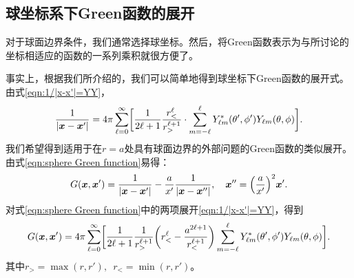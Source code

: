 \subsection{球坐标系下Green函数的展开}
\label{ssec:Green expansion in spherical coordinate}

对于球面边界条件，我们通常选择球坐标。然后，将Green函数表示为与所讨论的坐标相适应的函数的一系列乘积就很方便了。

事实上，根据我们所介绍的，我们可以简单地得到球坐标下Green函数的展开式。由式\eqref{eqn:1/|x-x'|=YY}，
\[
    \frac1{|\bm x-\bm x'|}=4\pi\sum_{\ell=0}^\infty\biggl[\frac1{2\ell+1}\frac{r_<^\ell}{r_>^{\ell+1}}\cdot\sum_{m=-\ell}^\ell Y^\ast_{\ell m}(\theta',\phi')Y_{\ell m}(\theta,\phi)\biggr].
\]
我们希望得到适用于在$r = a$处具有球面边界的外部问题的Green函数的类似展开。由式\eqref{eqn:sphere Green function}易得：
\[
    G(\bm x,\bm x')=\frac1{|\bm x-\bm x'|}-\frac a{x'}\frac1{|\bm x-\bm x''|},\quad\bm x''=\Bigl(\frac{a}{x'}\Bigr)^2\bm x'.
\]
对式\eqref{eqn:sphere Green function}中的两项展开\eqref{eqn:1/|x-x'|=YY}，得到
\begin{equation}
    \label{eqn:Green YY}
    G(\bm x,\bm x')=4\pi\sum_{\ell=0}^\infty\biggl[\frac1{2\ell+1}\frac1{r_>^{\ell+1}}\biggl(r_<^\ell-\frac{a^{2\ell+1}}{r_<^{\ell+1}}\biggr)\sum_{m=-\ell}^\ell Y_{\ell m}^\ast(\theta',\phi')Y_{\ell m}(\theta,\phi)\biggr].
\end{equation}
其中$r_>=\max(r,r'),\enspace r_<=\min(r,r')$。%

